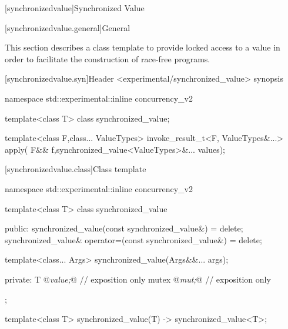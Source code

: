 [synchronizedvalue]{Synchronized Value}

[synchronizedvalue.general]{General}

This section describes a class template to provide locked access to a
value in order to facilitate the construction of race-free programs.

[synchronizedvalue.syn]{Header <experimental/synchronized_value> synopsis}

\begin{codeblock}
namespace std::experimental::inline concurrency_v2 {
    template<class T>
    class synchronized_value;

    template<class F,class... ValueTypes>
    invoke_result_t<F, ValueTypes&...> apply(
        F&& f,synchronized_value<ValueTypes>&... values);
}
\end{codeblock}

[synchronizedvalue.class]{Class template  }

\begin{codeblock}
namespace std::experimental::inline concurrency_v2 {
  template<class T>
    class synchronized_value
    {
    public:
        synchronized_value(const synchronized_value&) = delete;
        synchronized_value& operator=(const synchronized_value&) = delete;

        template<class... Args>
        synchronized_value(Args&&... args);

    private:
        T @\emph{value;}@   // exposition only
        mutex @\emph{mut;}@ // exposition only
    };

template<class T>
synchronized_value(T)
-> synchronized_value<T>;
}
\end{codeblock}

